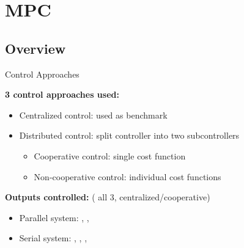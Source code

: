 \section{MPC}

\subsection{Overview}

\begin{frame}{Control Approaches}

  \textbf{3 control approaches used:}
  \begin{itemize}
    \item Centralized control: used as benchmark
    \item Distributed control: split controller into two subcontrollers
      \begin{itemize}
        \item Cooperative control: single cost function
        \item Non-cooperative control: individual cost functions
      \end{itemize}
  \end{itemize}
  \vspace{1em}

  \textbf{Outputs controlled:} ({\color{ETHpurple} all 3}, {\color{ETHlightblue} centralized/cooperative})
  \begin{itemize}
    \item Parallel system: {\color{ETHpurple} , ,} {\color{ETHlightblue} }
    \item Serial system: {\color{ETHpurple} , ,} {\color{ETHlightblue} , }
  \end{itemize}


\end{frame}



